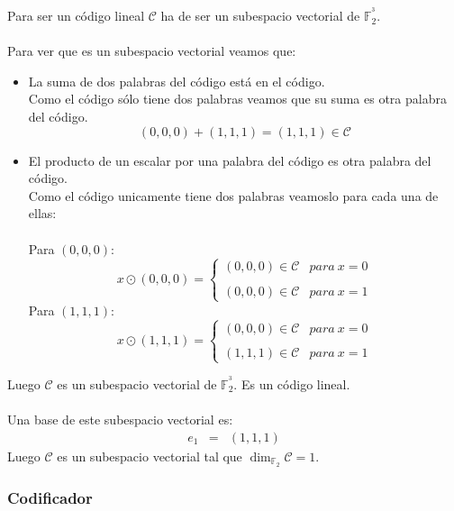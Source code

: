 Para ser un c\'odigo lineal $\mathcal{C}$ ha de ser un subespacio vectorial de
$\mathbb{F}^{^3}_2$.\\ \\
%
Para ver que es un subespacio vectorial veamos que:
\begin{itemize}
\item La suma de dos palabras del c\'odigo est\'a en el c\'odigo.\\

Como el c\'odigo s\'olo tiene dos palabras veamos que su suma es otra palabra
del c\'odigo.
\begin{displaymath}
(0,0,0)+(1,1,1)=(1,1,1)\in \mathcal{C}
\end{displaymath}
%
\newpage
%
\item El producto de un escalar por una palabra del c\'odigo es otra palabra
del c\'odigo.\\

Como el c\'odigo unicamente tiene dos palabras veamoslo para cada una de
ellas:\\ \\
%
Para $(0,0,0)$:
\begin{displaymath}
x\odot (0,0,0) =
\left\{ \begin{array}{ll}
(0,0,0)\in \mathcal{C} & para\ x = 0 \\
 & \\
(0,0,0)\in \mathcal{C} & para\ x = 1 
\end{array} \right.
\end{displaymath}
Para $(1,1,1)$:
\begin{displaymath}
x\odot (1,1,1) =
\left\{ \begin{array}{ll}
(0,0,0)\in \mathcal{C} & para\ x = 0\\
 & \\
(1,1,1)\in \mathcal{C} & para\ x = 1
\end{array} \right.
\end{displaymath}
\end{itemize}
Luego $\mathcal{C}$ es un subespacio vectorial de $\mathbb{F}^{^3}_2$. Es un
c\'odigo lineal.\\ \\
%
Una base de este subespacio vectorial es:
\begin{eqnarray*}
e_1&=&(1,1,1)
\end{eqnarray*}
Luego $\mathcal{C}$ es un subespacio vectorial tal que
$\dim_{\mathbb{F}_2}\mathcal{C} = 1$.

\subsubsection{Codificador}

